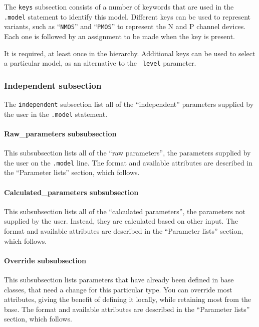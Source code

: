 The {\tt keys} subsection consists of a number of keywords that are
used in the {\tt .model} statement to identify this model.  Different
keys can be used to represent variants, such as ``{\tt NMOS}'' and
``{\tt PMOS}'' to represent the N and P channel devices.  Each one is
followed by an assignment to be made when the key is present.

It is required, at least once in the hierarchy.  Additional keys can
be used to select a particular model, as an alternative to the {\tt
level} parameter.
\subsubsection{Independent subsection}

The {\tt independent} subsection list all of the ``independent''
parameters supplied by the user in the {\tt .model} statement.

\paragraph{Raw\_parameters subsubsection}

This subsubsection lists all of the ``raw parameters'', the parameters
supplied by the user on the {\tt .model} line.  The format and
available attributes are described in the ``Parameter lists'' section,
which follows.

\paragraph{Calculated\_parameters subsubsection}

This subsubsection lists all of the ``calculated parameters'', the
parameters not supplied by the user.  Instead, they are calculated
based on other input.  The format and available attributes are
described in the ``Parameter lists'' section, which follows.

\paragraph{Override subsubsection}

This subsubsection lists parameters that have already been defined in
base classes, that need a change for this particular type.  You can
override most attributes, giving the benefit of defining it locally,
while retaining most from the base.  The format and available
attributes are described in the ``Parameter lists'' section, which
follows.

